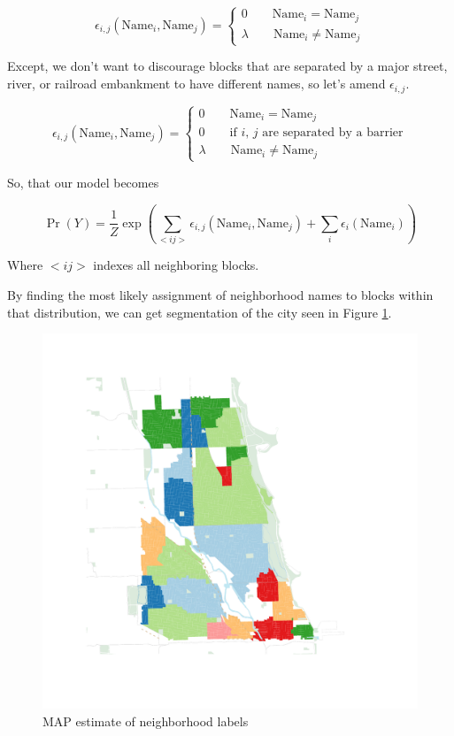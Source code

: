 \documentclass{article}
\begin{document}
\begin{equation}
\epsilon_{i,j}(\text{Name}_i,\text{Name}_j) = \begin{cases}
  0 \quad\quad \text{Name}_i = \text{Name}_j \\
  \lambda \quad\quad \text{Name}_i \neq \text{Name}_j 
\end{cases}
\end{equation}

Except, we don't want to discourage blocks that are separated by a
major street, river, or railroad embankment to have different names,
so let's amend $\epsilon_{i,j}$.

\begin{equation}
\epsilon_{i,j}(\text{Name}_i,\text{Name}_j) = \begin{cases}
  0 \quad\quad \text{Name}_i = \text{Name}_j \\
  0 \quad\quad \text{if $i$, $j$ are separated by a barrier} \\
  \lambda \quad\quad \text{Name}_i \neq \text{Name}_j 
\end{cases}
\end{equation}


So, that our model becomes

\begin{equation}
\Pr(Y) = \frac{1}{Z}\operatorname{exp}\left(\sum_{<i j>}\epsilon_{i,j}(\text{Name}_i,\text{Name}_j) + \sum_i\epsilon_i(\text{Name}_i)\right) 
\end{equation}

Where $<i j>$ indexes all neighboring blocks.

By finding the most likely assignment of neighborhood names to blocks
within that distribution, we can get segmentation of the city seen in
Figure \ref{fig:graphcut}.


\begin{figure}
\includegraphics{respect_grid.pdf}
\caption{MAP estimate of neighborhood labels}
\label{fig:graphcut}
\end{figure}
\end{document}
